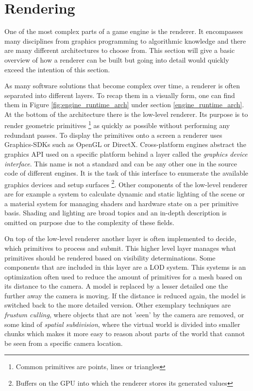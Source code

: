 \section{Rendering}

One of the most complex parts of a game engine is the renderer. It encompasses many disciplines from graphics programming to algorithmic knowledge and there are many different architectures to choose from. This section will give a basic overview of how a renderer can be built but going into detail would quickly exceed the intention of this section. 

As many software solutions that become complex over time, a renderer is often separated into different layers. To recap them in a visually form, one can find them in Figure \ref{fig:engine_runtime_arch} under section \ref{engine_runtime_arch}. At the bottom of the architecture there is the low-level renderer. Its purpose is to render geometric primitives \footnote{Common primitives are points, lines or triangles} as quickly as possible without performing any redundant passes. To display the primitives onto a screen a renderer uses Graphics-\acp{SDK} such as OpenGL or DirectX. Cross-platform engines abstract the graphics \ac{API} used on a specific platform behind a layer called the \textit{graphics device interface}. This name is not a standard and can be any other one in the source code of different engines. It is the task of this interface to enumerate the available graphics devices and setup surfaces \footnote{Buffers on the \ac{GPU} into which the renderer stores its generated values}. Other components of the low-level renderer are for example a system to calculate dynamic and static lighting of the scene or a material system for managing shaders and hardware state on a per primitive basis. Shading and lighting are broad topics and an in-depth description is omitted on purpose due to the complexity of these fields. 

On top of the low-level renderer another layer is often implemented to decide, which primitives to process and submit. This higher level layer manages what primitives should be rendered based on visibility determinations. Some components that are included in this layer are a \ac{LOD} system. This systems is an optimization often used to reduce the amount of primitives for a mesh based on its distance to the camera. A model is replaced by a lesser detailed one the further away the camera is moving. If the distance is reduced again, the model is switched back to the more detailed version. Other exemplary techniques are \textit{frustum culling}, where objects that are not 'seen' by the camera are removed, or some kind of \textit{spatial subdivision}, where the virtual world is divided into smaller chunks which makes it more easy to reason about parts of the world that cannot be seen from a specific camera location.

